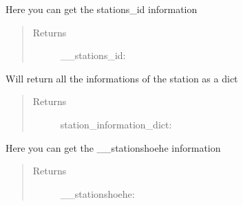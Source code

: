 \documentclass[letterpaper,10pt,english]{sphinxmanual}
\begin{document}
\begin{fulllineitems}
\begin{fulllineitems}
\begin{quote}
\begin{description}
\end{description}\end{quote}

\end{fulllineitems}


\begin{fulllineitems}
\label{\detokenize{DwdDataPrep:DwdDataPrep.Station.get_station_id}}
\sphinxAtStartPar
{} Here you can get the stations\_id information
\begin{quote}\begin{description}
\item[{Returns}] \leavevmode
\sphinxAtStartPar
\_\_stations\_id: 

\end{description}\end{quote}

\end{fulllineitems}


\begin{fulllineitems}
\label{\detokenize{DwdDataPrep:DwdDataPrep.Station.get_station_informations}}
\sphinxAtStartPar
{} Will return all the informations of the station as a dict
\begin{quote}\begin{description}
\item[{Returns}] \leavevmode
\sphinxAtStartPar
station\_information\_dict: 

\end{description}\end{quote}

\end{fulllineitems}


\begin{fulllineitems}
\label{\detokenize{DwdDataPrep:DwdDataPrep.Station.get_stationshoehe}}
\sphinxAtStartPar
{} Here you can get the \_\_stationshoehe information
\begin{quote}\begin{description}
\item[{Returns}] \leavevmode
\sphinxAtStartPar
\_\_stationshoehe: 


\end{description}
\end{quote}
\end{fulllineitems}
\end{fulllineitems}
\end{document}
